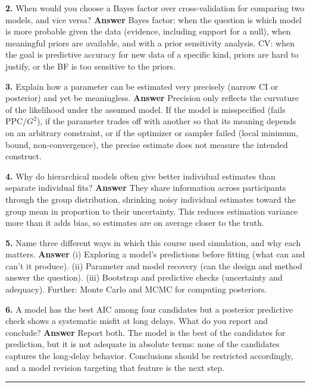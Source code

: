 \textbf{2.} When would you choose a Bayes factor over cross-validation
for comparing two models, and vice versa? \textbf{Answer} Bayes factor:
when the question is which model is more probable given the data
(evidence, including support for a null), when meaningful priors are
available, and with a prior sensitivity analysis. CV: when the goal is
predictive accuracy for new data of a specific kind, priors are hard to
justify, or the BF is too sensitive to the priors.

\textbf{3.} Explain how a parameter can be estimated very precisely
(narrow CI or posterior) and yet be meaningless. \textbf{Answer}
Precision only reflects the curvature of the likelihood under the
assumed model. If the model is misspecified (fails PPC/\(G^2\)), if the
parameter trades off with another so that its meaning depends on an
arbitrary constraint, or if the optimizer or sampler failed (local
minimum, bound, non-convergence), the precise estimate does not measure
the intended construct.

\textbf{4.} Why do hierarchical models often give better individual
estimates than separate individual fits? \textbf{Answer} They share
information across participants through the group distribution,
shrinking noisy individual estimates toward the group mean in proportion
to their uncertainty. This reduces estimation variance more than it adds
bias, so estimates are on average closer to the truth.

\textbf{5.} Name three different ways in which this course used
simulation, and why each matters. \textbf{Answer} (i) Exploring a
model's predictions before fitting (what can and can't it produce). (ii)
Parameter and model recovery (can the design and method answer the
question). (iii) Bootstrap and predictive checks (uncertainty and
adequacy). Further: Monte Carlo and MCMC for computing posteriors.

\textbf{6.} A model has the best AIC among four candidates but a
posterior predictive check shows a systematic misfit at long delays.
What do you report and conclude? \textbf{Answer} Report both. The model
is the best of the candidates for prediction, but it is not adequate in
absolute terms: none of the candidates captures the long-delay behavior.
Conclusions should be restricted accordingly, and a model revision
targeting that feature is the next step.

\begin{center}\rule{0.5\linewidth}{0.5pt}\end{center}

